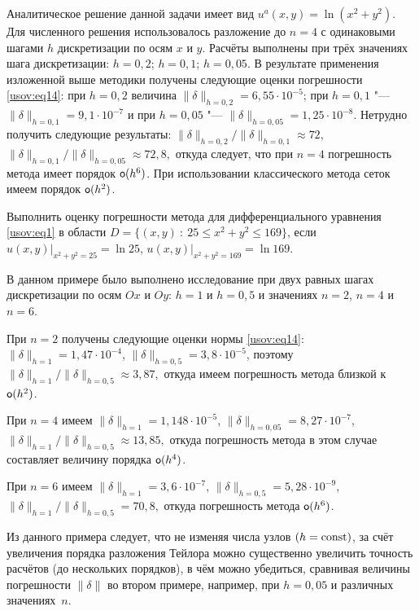 Аналитическое решение данной задачи имеет вид $u^a(x,y)=\ln
(x^2+y^2)$. Для численного решения использовалось разложение до
$n=4$ с одинаковыми шагами $h$ дискретизации по осям $x$ и $y$.
Расчёты выполнены при трёх значениях шага дискретизации: $h=0,2$;
$h=0,1$; $h=0,05$. В результате применения изложенной выше
методики получены следующие оценки погрешности \eqref{usov:eq14}:
при $h=0,2$ величина $\|\delta\|_{h=0,2} =6,55 \cdot 10^{-5}$; при
$h=0,1$ "--- $\|\delta\|_{h=0,1} =9,1 \cdot 10^{-7}$  и при
$h=0,05$ "--- $\|\delta\|_{h=0,05} =1,25 \cdot 10^{-8}$. Нетрудно
получить следующие результаты: $
{\|\delta\|_{h=0,2}}/{\|\delta\|_{h=0,1}}\approx 72$,
${\|\delta\|_{h=0,1}}/{\|\delta\|_{h=0,05}}\approx 72,8, $ откуда
следует, что при $n=4$ погрешность метода имеет порядок ${\sf
o}(h^6)$. При использовании классического метода сеток
\cite{usov:bib5} имеем  порядок ${\sf o}(h^2)$.
\smallskip

\begin{example}[2]
Выполнить оценку погрешности метода для дифференциального
уравнения \eqref{usov:eq1} в области $D=\{ (x, y)~:~25 \leq x^2 +
y ^2 \leq 169 \}$, если $u (x, y) \big|_{x^2+y^2=25}=\ln 25$,
$u(x, y) \big|_{x^2+y^2=169}=\ln 169$.
\end{example}

В данном примере было выполнено исследование при двух равных шагах
дискретизации по осям $Ox$ и $Oy$: $h=1$ и $h=0,5$ и значениях
$n=2$, $n=4$ и $n=6$.

При $n=2$ получены следующие оценки нормы \eqref{usov:eq14}:
$\|\delta\|_{h=1}=1,47\cdot 10^{-4}$, $\|\delta\|_{h=0,5}=3,8\cdot
10^{-5}$, поэтому
$
{\|\delta\|_{h=1}}/{\|\delta\|_{h=0,5}}\approx 3,87,
$
откуда имеем погрешность метода близкой к ${\sf o}(h^2)$.

При $n=4$ имеем $\|\delta\|_{h=1}=1,148\cdot 10^{-5}$,
$\|\delta\|_{h=0,05}=8,27\cdot 10^{-7}$, $
{\|\delta\|_{h=1}}/{\|\delta\|_{h=0,5}}\approx 13,85, $ откуда
погрешность метода в этом случае составляет величину порядка ${\sf
o}(h^4)$.

При $n=6$ имеем $\|\delta\|_{h=1}=3,6\cdot 10^{-7}$,
$\|\delta\|_{h=0,5}=5,28\cdot 10^{-9}$,
$
{\|\delta\|_{h=1}}/{\|\delta\|_{h=0,5}}=70,8,
$
откуда погрешность метода ${\sf o}(h^6)$.

Из данного примера следует, что не изменяя числа узлов $(h={\rm
const})$, за счёт увеличения порядка  разложения Тейлора можно
существенно увеличить точность расчётов (до нескольких порядков),
в чём можно убедиться, сравнивая величины погрешности $\|\delta\|$
во втором примере, например, при $h=0,05$ и различных значениях~$n$.


